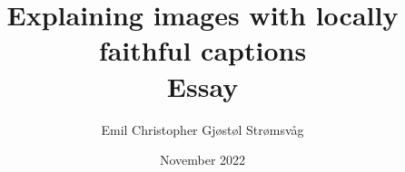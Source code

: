 \documentclass[UKenglish]{article}
\begin{document}
    \title{Explaining images with locally faithful captions \\ \large Essay}     
    \author{Emil Christopher Gjøstøl Strømsvåg}
    \date{November 2022}
    \maketitle

\newpage
\tableofcontents{}
\newpage










\newpage
\printbibliography
\end{document}
